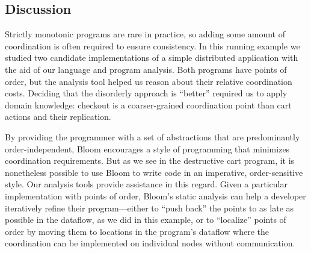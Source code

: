 \subsection{Discussion}
Strictly monotonic programs are rare in practice, so adding some amount of
coordination is often required to ensure consistency. In this running example we
studied two candidate implementations of a simple distributed application with
the aid of our language and program analysis. Both programs have points of
order, but the analysis tool helped us reason about their relative coordination
costs.  Deciding that the disorderly approach is ``better'' required us to apply
domain knowledge: checkout is a coarser-grained coordination point than cart
actions and their replication.

By providing the programmer with a set of abstractions that are predominantly
order-independent, Bloom encourages a style of programming that minimizes
coordination requirements. But as we see in the destructive cart program,
it is nonetheless possible to use Bloom to write code in an imperative,
order-sensitive style. Our analysis tools provide assistance in this regard.  Given a
particular implementation with points of order, Bloom's static analysis can help
a developer iteratively refine their program---either to ``push back'' the
points to as late as possible in the dataflow, as we did in this example, or to
``localize'' points of order by moving them to locations in the program's dataflow
where the coordination can be implemented on individual nodes without
communication.
